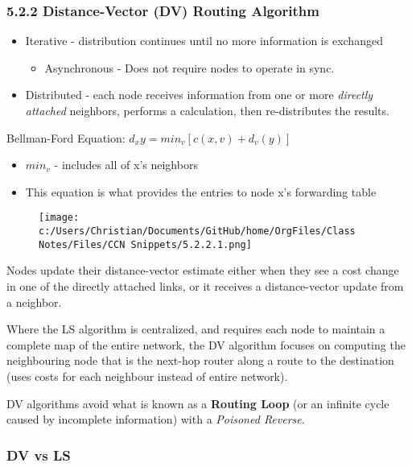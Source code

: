 \documentclass[11pt]{article}
\begin{document}
\subsubsection{5.2.2 Distance-Vector (DV) Routing Algorithm}
\label{sec:org257f67f}

\begin{itemize}
\item Iterative - distribution continues until no more information is exchanged
\begin{itemize}
\item Asynchronous - Does not require nodes to operate in sync.
\end{itemize}
\item Distributed - each node receives information from one or more \emph{directly attached} neighbors, performs a calculation, then re-distributes the results.
\end{itemize}


Bellman-Ford Equation: \(d_{x}y = min_{v}[c(x,v)+d_{v}(y)]\)
\begin{itemize}
\item \(min_v\) - includes all of x's neighbors
\item This equation is what provides the entries to node x's forwarding table
\end{itemize}

\begin{figure}[htbp]
\centering
\texttt{[image: c:/Users/Christian/Documents/GitHub/home/OrgFiles/Class Notes/Files/CCN Snippets/5.2.2.1.png]}
\end{figure}

Nodes update their distance-vector estimate either when they see a cost change in one of the directly attached links, or it receives a distance-vector update from a neighbor.

Where the LS algorithm is centralized, and requires each node to maintain a complete map of the entire network, the DV algorithm focuses on computing the neighbouring node that is the next-hop router along a route to the destination (uses costs for each neighbour instead of entire network).

DV algorithms avoid what is known as a \textbf{Routing Loop} (or an infinite cycle caused by incomplete information) with a \emph{Poisoned Reverse}.

\subsubsection{DV vs LS}
\label{sec:orged3ba5c}
\end{document}
